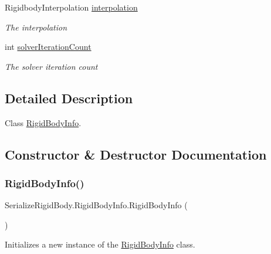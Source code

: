 \begin{DoxyCompactItemize}
Rigidbody\+Interpolation \hyperlink{class_serialize_rigid_body_1_1_rigid_body_info_a06a8f1e35a4e5fdf1d7024b3e5087cda}{interpolation}
\begin{DoxyCompactList}\small\item\em The interpolation \end{DoxyCompactList}\item 
int \hyperlink{class_serialize_rigid_body_1_1_rigid_body_info_a7fd02a3a26ebce962854c85f2344fdc0}{solver\+Iteration\+Count}
\begin{DoxyCompactList}\small\item\em The solver iteration count \end{DoxyCompactList}\end{DoxyCompactItemize}


\subsection{Detailed Description}
Class \hyperlink{class_serialize_rigid_body_1_1_rigid_body_info}{Rigid\+Body\+Info}. 



\subsection{Constructor \& Destructor Documentation}
\mbox{\label{class_serialize_rigid_body_1_1_rigid_body_info_a72e49914bb9032fe421733a06f545dd1}} 
\subsubsection{\texorpdfstring{Rigid\+Body\+Info()}{RigidBodyInfo()}\hspace{0.1cm}{\footnotesize\ttfamily [1/2]}}
{\footnotesize\ttfamily Serialize\+Rigid\+Body.\+Rigid\+Body\+Info.\+Rigid\+Body\+Info (\begin{DoxyParamCaption}{ }\end{DoxyParamCaption})\hspace{0.3cm}{\ttfamily [inline]}}



Initializes a new instance of the \hyperlink{class_serialize_rigid_body_1_1_rigid_body_info}{Rigid\+Body\+Info} class. 

